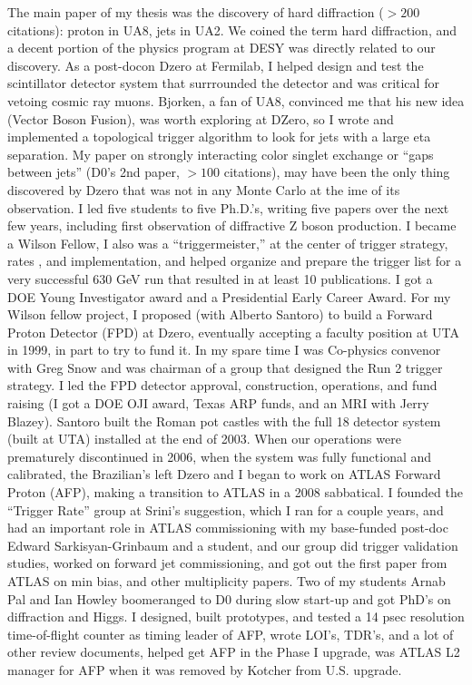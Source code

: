 
\vspace*{0.2in}
\vspace*{0.1in}

 The main paper of my thesis was the discovery of hard diffraction ($>200$ citations): proton in UA8, jets in UA2.  We coined the term hard diffraction, and a decent portion of the physics program at DESY was directly related to our discovery.   As a post-docon Dzero at Fermilab, I helped design and test the scintillator detector system that surrrounded the detector and was critical for vetoing cosmic ray muons. Bjorken, a fan of UA8, convinced me that his new idea  (Vector Boson Fusion),  was worth exploring at DZero, so I wrote and implemented a topological trigger algorithm to look for jets with a large eta separation.   My  paper on strongly interacting color singlet exchange or ``gaps between jets''  (D0's 2nd paper, $>100$ citations), may have been the only thing discovered by Dzero that was not in any Monte Carlo at the ime of its observation. I led five students to five Ph.D.'s, writing five papers  over the next few years, including first observation of diffractive Z boson production.  I became a Wilson Fellow, I also was a ``triggermeister,''  at the center of trigger strategy, rates , and implementation,  and helped organize and prepare the trigger list for  a very successful 630 GeV run that resulted in at least 10 publications.  I got a  DOE Young Investigator award and a Presidential Early Career Award. For my Wilson fellow project,  I proposed (with Alberto Santoro) to build a Forward Proton Detector (FPD) at Dzero,  eventually accepting a faculty position at  UTA in 1999, in part to try to fund it.  In my spare time I was Co-physics convenor with Greg Snow and was chairman of a group that designed the  Run 2 trigger strategy.  I led  the FPD detector approval, construction, operations, and fund raising (I got a DOE OJI award,  Texas ARP funds,  and an MRI with Jerry Blazey). Santoro built the Roman pot castles  with the full 18 detector system (built at UTA) installed at the end of 2003.  When our operations were prematurely discontinued in 2006, when the system was fully functional and calibrated, the Brazilian's left Dzero  and I began to work on ATLAS Forward Proton (AFP), making a transition to ATLAS in a 2008 sabbatical. I founded the  ``Trigger Rate'' group at Srini's suggestion,  which I ran for a couple years, and had an important role in ATLAS commissioning with my base-funded post-doc Edward Sarkisyan-Grinbaum and a student, and our group did trigger validation studies, worked on forward jet commissioning,  and got out the first paper from ATLAS on min bias,  and other multiplicity papers.  Two of my students Arnab Pal and Ian Howley  boomeranged to D0  during slow start-up and got PhD's on diffraction and Higgs.  I designed, built prototypes, and tested a 14 psec resolution time-of-flight counter as timing leader of AFP, wrote LOI's, TDR's, and a lot of other review documents, helped get AFP in the Phase I upgrade, was ATLAS L2 manager for AFP when it was removed by Kotcher from U.S. upgrade. 